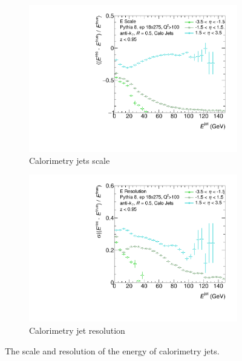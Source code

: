 \begin{figure}
    \centering
    \begin{subfigure}{0.4\textwidth}
        \centering
        \includegraphics[width=\linewidth]{figs/Final_Plots/JES_calo_grouped.pdf}
        \caption{Calorimetry jets scale}
        \label{fig:calo_energy_scale}
    \end{subfigure}
    \hfill
    \begin{subfigure}{0.4\textwidth}
        \centering
        \includegraphics[width=\linewidth]{figs/Final_Plots/JER_E_calo_grouped.pdf}
        \caption{Calorimetry jet resolution}
        \label{fig:calo_energy_resolution}
    \end{subfigure}
    \caption{The scale and resolution of the energy of calorimetry jets.}
    \label{fig:calo_energy_reso_scale}
\end{figure}



